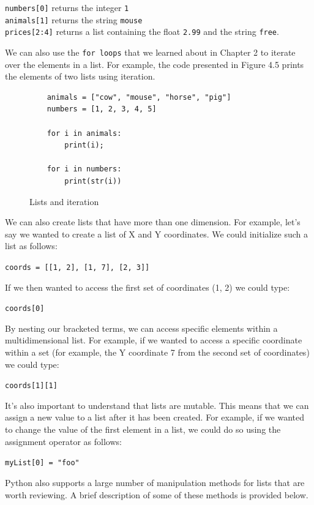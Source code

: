 \documentclass{book}
\begin{document}
\texttt{numbers[0]} returns the integer \texttt{1}\\
\texttt{animals[1]} returns the string \texttt{mouse}\\
\texttt{prices[2:4]} returns a list containing the float \texttt{2.99} and the string \texttt{free}.

We can also use the \texttt{for loops} that we learned about in Chapter 2 to iterate over the elements in a list. For example, the code presented in Figure 4.5 prints the elements of two lists using iteration. 

\begin{figure}[h]
	\caption{Lists and iteration}
	\begin{lstlisting}
	animals = ["cow", "mouse", "horse", "pig"]
	numbers = [1, 2, 3, 4, 5]

	for i in animals:
		print(i);

	for i in numbers:
		print(str(i))
	\end{lstlisting}
\end{figure}

We can also create lists that have more than one dimension. For example, let's say we wanted to create a list of X and Y coordinates. We could initialize such a list as follows:

\texttt{coords = [[1, 2], [1, 7], [2, 3]]}
	
If we then wanted to access the first set of coordinates (1, 2) we could type:

\texttt{coords[0]}

By nesting our bracketed terms, we can access specific elements within a multidimensional list. For example, if we wanted to access a specific coordinate within a set (for example, the Y coordinate 7 from the second set of coordinates) we could type:

\texttt{coords[1][1]}

It's also important to understand that lists are mutable. This means that we can assign a new value to a list after it has been created. For example, if we wanted to change the value of the first element in a list, we could do so using the assignment operator as follows:

\texttt{myList[0] = "foo"}

Python also supports a large number of manipulation methods for lists that are worth reviewing. A brief description of some of these methods is provided below.
\end{document}
